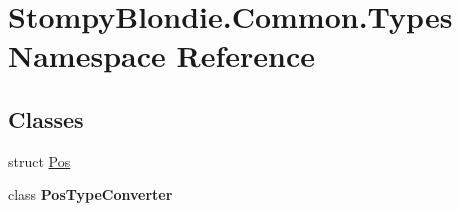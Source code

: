 \hypertarget{namespace_stompy_blondie_1_1_common_1_1_types}{}\section{Stompy\+Blondie.\+Common.\+Types Namespace Reference}
\label{namespace_stompy_blondie_1_1_common_1_1_types}
\subsection*{Classes}
\begin{DoxyCompactItemize}
\item 
struct \mbox{\hyperlink{struct_stompy_blondie_1_1_common_1_1_types_1_1_pos}{Pos}}
\item 
class {\bfseries Pos\+Type\+Converter}
\end{DoxyCompactItemize}
